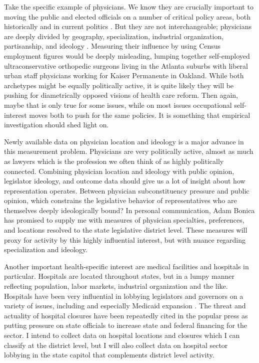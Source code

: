 \documentclass[
  oneside]{book}
\begin{document}
Take the specific example of physicians. We know they are crucially important to moving the public and elected officials on a number of critical policy areas, both historically and in current politics \citep{Starr:2008, Starr:2013, Patashnik:2017}. But they are not interchangeable; physicians are deeply divided by geography, specialization, industrial organization, partisanship, and ideology \citep{Bonica:2014, Bonica:2015, Bonica:2017a}. Measuring their influence by using Census employment figures would be deeply misleading, lumping together self-employed ultraconservative orthopedic surgeons living in the Atlanta suburbs with liberal urban staff physicians working for Kaiser Permanente in Oakland. While both archetypes might be equally politically active, it is quite likely they will be pushing for diametrically opposed visions of health care reform. Then again, maybe that is only true for some issues, while on most issues occupational self-interest moves both to push for the same policies. It is something that empirical investigation should shed light on.

Newly available data on physician location and ideology \citep{Bonica:2017a, Bonica:2017} is a major advance in this measurement problem. Physicians are very politically active, almost as much as lawyers which is the profession we often think of as highly politically connected. Combining physician location and ideology with public opinion, legislator ideology, and outcome data should give us a lot of insight about how representation operates. Between physician subconstituency pressure and public opinion, which constrains the legislative behavior of representatives who are themselves deeply ideologically bound? In personal communication, Adam Bonica has promised to supply me with measures of physician specialties, preferences, and locations resolved to the state legislative district level. These measures will proxy for activity by this highly influential interest, but with nuance regarding specialization and ideology.

Another important health-specific interest are medical facilities and hospitals in particular. Hospitals are located throughout states, but in a lumpy manner reflecting population, labor markets, industrial organization and the like. Hospitals have been very influential in lobbying legislators and governors on a variety of issues, including and especially Medicaid expansion \citep{Jacobs:2015}. The threat and actuality of hospital closures have been repeatedly cited in the popular press as putting pressure on state officials to increase state and federal financing for the sector. I intend to collect data on hospital locations and closures which I can classify at the district level, but I will also collect data on hospital sector lobbying in the state capitol that complements district level activity.
\end{document}
